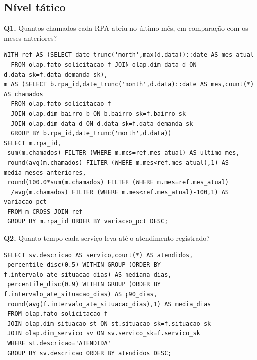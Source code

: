 \documentclass[12pt,a4paper]{article}
\begin{document}
\subsection*{Nível tático}
\noindent\begin{minipage}{\textwidth}
\small\textbf{Q1.} Quantos chamados cada RPA abriu no último mês, em comparação com os meses anteriores?\par\vspace{2pt}
\begin{lstlisting}
WITH ref AS (SELECT date_trunc('month',max(d.data))::date AS mes_atual
  FROM olap.fato_solicitacao f JOIN olap.dim_data d ON d.data_sk=f.data_demanda_sk),
m AS (SELECT b.rpa_id,date_trunc('month',d.data)::date AS mes,count(*) AS chamados
  FROM olap.fato_solicitacao f
  JOIN olap.dim_bairro b ON b.bairro_sk=f.bairro_sk
  JOIN olap.dim_data d ON d.data_sk=f.data_demanda_sk
  GROUP BY b.rpa_id,date_trunc('month',d.data))
SELECT m.rpa_id,
 sum(m.chamados) FILTER (WHERE m.mes=ref.mes_atual) AS ultimo_mes,
 round(avg(m.chamados) FILTER (WHERE m.mes<ref.mes_atual),1) AS media_meses_anteriores,
 round(100.0*sum(m.chamados) FILTER (WHERE m.mes=ref.mes_atual)
  /avg(m.chamados) FILTER (WHERE m.mes<ref.mes_atual)-100,1) AS variacao_pct
 FROM m CROSS JOIN ref
 GROUP BY m.rpa_id ORDER BY variacao_pct DESC;
\end{lstlisting}
\end{minipage}\par\vspace{8pt}
\noindent\begin{minipage}{\textwidth}
\small\textbf{Q2.} Quanto tempo cada serviço leva até o atendimento registrado?\par\vspace{2pt}
\begin{lstlisting}
SELECT sv.descricao AS servico,count(*) AS atendidos,
 percentile_disc(0.5) WITHIN GROUP (ORDER BY f.intervalo_ate_situacao_dias) AS mediana_dias,
 percentile_disc(0.9) WITHIN GROUP (ORDER BY f.intervalo_ate_situacao_dias) AS p90_dias,
 round(avg(f.intervalo_ate_situacao_dias),1) AS media_dias
 FROM olap.fato_solicitacao f
 JOIN olap.dim_situacao st ON st.situacao_sk=f.situacao_sk
 JOIN olap.dim_servico sv ON sv.servico_sk=f.servico_sk
 WHERE st.descricao='ATENDIDA'
 GROUP BY sv.descricao ORDER BY atendidos DESC;
\end{lstlisting}
\end{minipage}\par\vspace{8pt}
\end{document}
